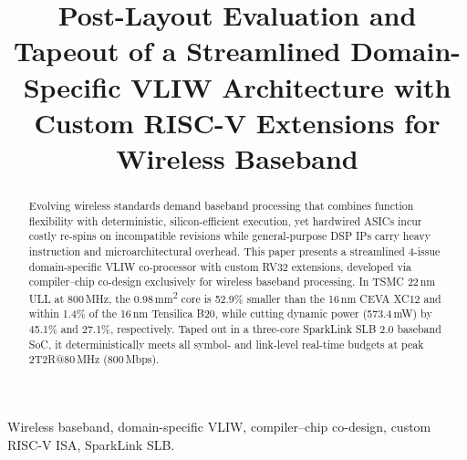 \documentclass[9pt,conference]{IEEEtran}
\begin{document}
\title{Post-Layout Evaluation and Tapeout of a Streamlined Domain-Specific VLIW Architecture with Custom RISC-V Extensions for Wireless Baseband\\
}

\author{}

\maketitle

\begin{abstract}
Evolving wireless standards demand baseband processing that combines function flexibility with deterministic, silicon-efficient execution, yet hardwired ASICs incur costly re-spins on incompatible revisions while general-purpose DSP IPs carry heavy instruction and microarchitectural overhead. This paper presents a streamlined 4-issue domain-specific VLIW co-processor with custom RV32 extensions, developed via compiler--chip co-design exclusively for wireless baseband processing. In TSMC 22\,nm ULL at 800\,MHz, the 0.98\,mm\textsuperscript{2} core is 52.9\% smaller than the 16\,nm CEVA XC12 and within 1.4\% of the 16\,nm Tensilica B20, while cutting dynamic power (573.4\,mW) by 45.1\% and 27.1\%, respectively. Taped out in a three-core SparkLink SLB 2.0 baseband SoC, it deterministically meets all symbol- and link-level real-time budgets at peak 2T2R@80\,MHz (800\,Mbps).
\end{abstract}

\begin{IEEEkeywords}
Wireless baseband, domain-specific VLIW, compiler--chip co-design, custom RISC-V ISA, SparkLink SLB.
\end{IEEEkeywords}
\end{document}
